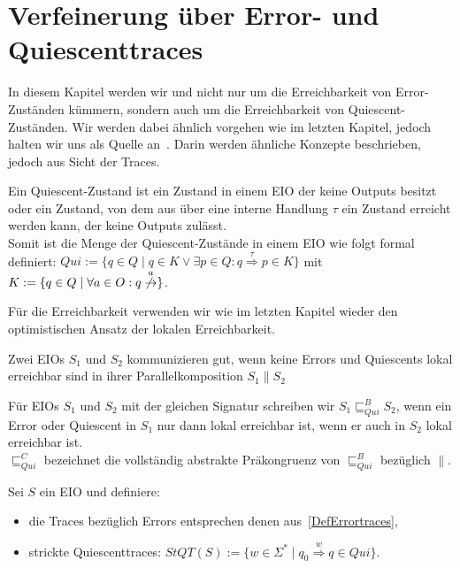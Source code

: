 \chapter{Verfeinerung über Error- und Quiescenttraces}

In diesem Kapitel werden wir und nicht nur um die Erreichbarkeit von
Error-Zuständen kümmern, sondern auch um die Erreichbarkeit von
Quiescent-Zuständen. Wir werden dabei ähnlich vorgehen wie im letzten Kapitel,
jedoch halten wir uns als Quelle an~\cite{Chilton2013}. Darin werden ähnliche Konzepte
beschrieben, jedoch aus Sicht der Traces.

\begin{Def}[Quiescent]
  Ein Quiescent-Zustand ist ein Zustand in einem EIO der keine Outputs besitzt
  oder ein Zustand, von dem aus über eine interne Handlung $\tau$ ein Zustand
  erreicht werden kann, der keine Outputs zulässt.\\
  Somit ist die Menge der Quiescent-Zustände in einem EIO wie folgt formal
  definiert: $Qui:=\{q\in Q\mid q\in K\vee \exists p\in Q:
  q\overset{\tau}{\Rightarrow} p\in K\}$ mit $K:=\{q\in Q\mid \forall a\in O:
  q\overset{a}{\not{\hspace{-0.1cm}\rightarrow}}\}$.
\end{Def}

Für die Erreichbarkeit verwenden wir wie im letzten Kapitel wieder den
optimistischen Ansatz der lokalen Erreichbarkeit.

\begin{Def}
  Zwei EIOs $S_1$ und $S_2$ kommunizieren gut, wenn keine Errors und Quiescents
  lokal erreichbar sind in ihrer Parallelkomposition $S_1\| S_2$
\end{Def}

\begin{Def}
  Für EIOs $S_1$ und $S_2$ mit der gleichen Signatur schreiben wir
  $S_1\sqsubseteq _{Qui}^B S_2$, wenn ein Error oder Quiescent in $S_1$ nur
  dann lokal erreichbar ist, wenn er auch in $S_2$ lokal erreichbar ist.\\
  $\sqsubseteq _{Qui}^C$ bezeichnet die vollständig abstrakte Präkongruenz von
  $\sqsubseteq  _{Qui}^ B$ bezüglich $\|$.
\end{Def}

\begin{Def}
  \label{DefQuiescenttraces}
  Sei $S$ ein EIO und definiere:
  \begin{itemize}
    \item die Traces bezüglich Errors entsprechen denen
      aus~\ref{DefErrortraces},
    \item strickte Quiescenttraces: $StQT(S) := \{w\in\Sigma ^*\mid q_0
      \overset{w}{\Rightarrow} q\in Qui\}$.
  \end{itemize}
\end{Def}

